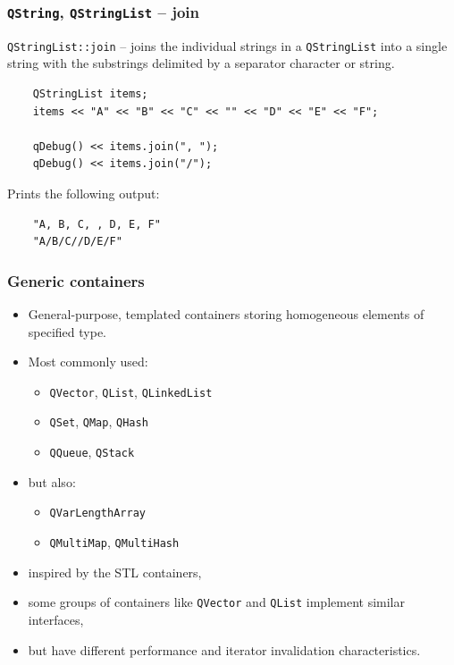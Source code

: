 \begin{frame}[fragile]
  \frametitle{\texttt{QString}, \texttt{QStringList} -- join}
    \texttt{QStringList::join} -- joins the individual strings in a
    \texttt{QStringList} into a single string with the substrings delimited
    by a separator character or string.

    \begin{lstlisting}
	QStringList items;
	items << "A" << "B" << "C" << "" << "D" << "E" << "F";

	qDebug() << items.join(", ");
	qDebug() << items.join("/");
    \end{lstlisting}
     \small
     Prints the following output:
    \begin{verbatim}
	"A, B, C, , D, E, F"
	"A/B/C//D/E/F"
    \end{verbatim}
\end{frame}

\begin{frame}
  \frametitle{Generic containers}
  \begin{itemize}
    \item General-purpose, templated containers storing homogeneous elements
    of specified type.
    \item Most commonly used:
    \begin{itemize}
      \item \texttt{QVector}, \texttt{QList}, \texttt{QLinkedList}
      \item \texttt{QSet}, \texttt{QMap}, \texttt{QHash}
      \item \texttt{QQueue}, \texttt{QStack}
    \end{itemize}
    \item but also:
    \begin{itemize}
      \item \texttt{QVarLengthArray}
      \item \texttt{QMultiMap}, \texttt{QMultiHash}
    \end{itemize}
    \item inspired by the STL containers,
    \item some groups of containers like \texttt{QVector} and \texttt{QList}
    implement similar interfaces,
    \item but have different performance and iterator invalidation characteristics.
  \end{itemize}
\end{frame}

